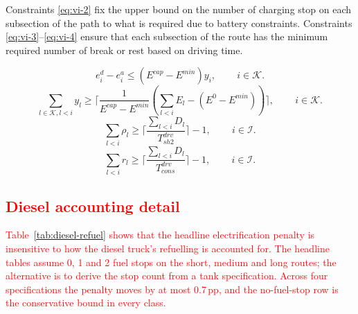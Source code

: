 \documentclass[preprint,12pt,3p]{elsarticle}
\newcommand{\red}[1]{\textcolor{red}{#1}}
\begin{document}
Constraints \eqref{eq:vi-2} fix the upper bound on the number of charging stop on each subsection of the path to what is required due to battery constraints. Constraints \eqref{eq:vi-3}--\eqref{eq:vi-4} ensure that each subsection of the route has the minimum required number of break or rest based on driving time.

\begin{equation}
    e^d_i-e^a_i \leq (E^{cap}-E^{min})y_i,
    \qquad \, i \in \mathcal{K}.
    \label{eq:vi-1}
\end{equation}
\begin{equation}
    \sum_{l \in \mathcal K, l<i} y_l \geq \lceil \frac{1}{E^{cap}-E^{min}}(\sum_{l < i} E_l - (E^{0}-E^{min})) \rceil,
    \qquad \, i \in \mathcal{K}.
    \label{eq:vi-2}
\end{equation}
\begin{equation}
    \sum_{l<i} \rho_l \geq \lceil \frac{\sum_{l<i} D_l}{T^{drv}_{sh2}} \rceil-1,
    \qquad \, i \in \mathcal{I}.
    \label{eq:vi-3}
\end{equation}
\begin{equation}
    \sum_{l<i} r_l \geq \lceil \frac{\sum_{l<i} D_l}{T^{drv}_{cons}} \rceil -1,
    \qquad \, i \in \mathcal{I}.
    \label{eq:vi-4}
\end{equation}


\red{\section{Diesel accounting detail} \label{sec:diesel-appendix}}

\red{Table~\ref{tab:diesel-refuel} shows that the headline electrification
penalty is insensitive to how the diesel truck's refuelling is accounted for.
The headline tables assume 0, 1 and 2 fuel stops on the short, medium and long
routes; the alternative is to derive the stop count from a tank specification.
Across four specifications the penalty moves by at most 0.7\,pp, and the
no-fuel-stop row is the conservative bound in every class.}
\end{document}
